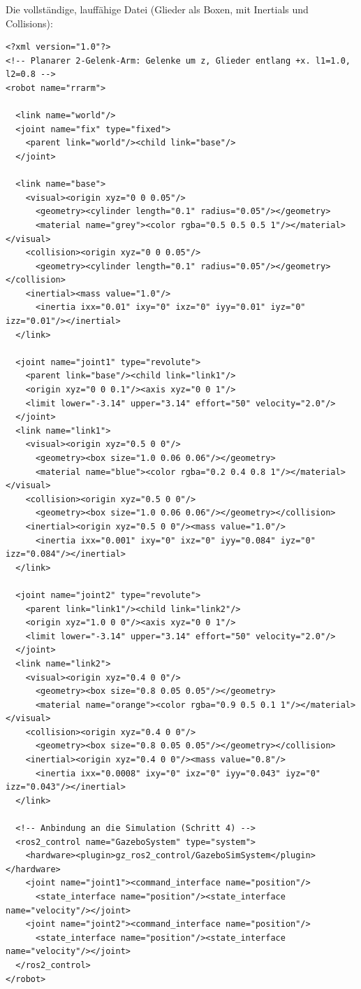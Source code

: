 \noindent Die vollständige, lauffähige Datei (Glieder als Boxen, mit
Inertials und Collisions):
\begin{lstlisting}[style=xml,caption={\code{urdf/arm.urdf.xacro} -- vollständig}]
<?xml version="1.0"?>
<!-- Planarer 2-Gelenk-Arm: Gelenke um z, Glieder entlang +x. l1=1.0, l2=0.8 -->
<robot name="rrarm">

  <link name="world"/>
  <joint name="fix" type="fixed">
    <parent link="world"/><child link="base"/>
  </joint>

  <link name="base">
    <visual><origin xyz="0 0 0.05"/>
      <geometry><cylinder length="0.1" radius="0.05"/></geometry>
      <material name="grey"><color rgba="0.5 0.5 0.5 1"/></material></visual>
    <collision><origin xyz="0 0 0.05"/>
      <geometry><cylinder length="0.1" radius="0.05"/></geometry></collision>
    <inertial><mass value="1.0"/>
      <inertia ixx="0.01" ixy="0" ixz="0" iyy="0.01" iyz="0" izz="0.01"/></inertial>
  </link>

  <joint name="joint1" type="revolute">
    <parent link="base"/><child link="link1"/>
    <origin xyz="0 0 0.1"/><axis xyz="0 0 1"/>
    <limit lower="-3.14" upper="3.14" effort="50" velocity="2.0"/>
  </joint>
  <link name="link1">
    <visual><origin xyz="0.5 0 0"/>
      <geometry><box size="1.0 0.06 0.06"/></geometry>
      <material name="blue"><color rgba="0.2 0.4 0.8 1"/></material></visual>
    <collision><origin xyz="0.5 0 0"/>
      <geometry><box size="1.0 0.06 0.06"/></geometry></collision>
    <inertial><origin xyz="0.5 0 0"/><mass value="1.0"/>
      <inertia ixx="0.001" ixy="0" ixz="0" iyy="0.084" iyz="0" izz="0.084"/></inertial>
  </link>

  <joint name="joint2" type="revolute">
    <parent link="link1"/><child link="link2"/>
    <origin xyz="1.0 0 0"/><axis xyz="0 0 1"/>
    <limit lower="-3.14" upper="3.14" effort="50" velocity="2.0"/>
  </joint>
  <link name="link2">
    <visual><origin xyz="0.4 0 0"/>
      <geometry><box size="0.8 0.05 0.05"/></geometry>
      <material name="orange"><color rgba="0.9 0.5 0.1 1"/></material></visual>
    <collision><origin xyz="0.4 0 0"/>
      <geometry><box size="0.8 0.05 0.05"/></geometry></collision>
    <inertial><origin xyz="0.4 0 0"/><mass value="0.8"/>
      <inertia ixx="0.0008" ixy="0" ixz="0" iyy="0.043" iyz="0" izz="0.043"/></inertial>
  </link>

  <!-- Anbindung an die Simulation (Schritt 4) -->
  <ros2_control name="GazeboSystem" type="system">
    <hardware><plugin>gz_ros2_control/GazeboSimSystem</plugin></hardware>
    <joint name="joint1"><command_interface name="position"/>
      <state_interface name="position"/><state_interface name="velocity"/></joint>
    <joint name="joint2"><command_interface name="position"/>
      <state_interface name="position"/><state_interface name="velocity"/></joint>
  </ros2_control>
</robot>
\end{lstlisting}

